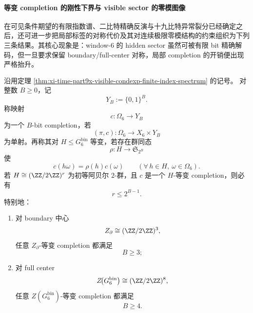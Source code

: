 \paragraph{等变 completion 的刚性下界与 visible sector 的零模图像}
在可见条件期望的有限指数谱、二比特精确反演与十九比特异常裂分已经确定之后，还可进一步把局部标签的对称代价及其对连续极限零模结构的约束组织为下列三条结果。其核心现象是：window-\(6\) 的 hidden sector 虽然可被有限 bit 精确解码，但一旦要求保留 boundary/full-center 对称，局部 completion 的开销便出现严格抬升。

\begin{theorem}\label{thm:xi-time-part9x-equivariant-completion-bit-lower-bound}
沿用定理 \ref{thm:xi-time-part9x-visible-condexp-finite-index-spectrum} 的记号。
对整数 \(B\ge 0\)，记
\[
Y_B:=\{0,1\}^B.
\]
称映射
\[
c:\Omega_6\to Y_B
\]
为一个 \(B\)-bit completion，若
\[
(\pi,c):\Omega_6\longrightarrow X_6\times Y_B
\]
为单射。再称其对 \(H\le G_6^{\mathrm{bin}}\) 等变，若存在群同态
\[
\rho:H\to \mathfrak S_{2^B}
\]
使
\[
c(h\omega)=\rho(h)c(\omega)
\qquad
(\forall\, h\in H,\ \omega\in \Omega_6).
\]
若 \(H\cong (\ZZ/2\ZZ)^r\) 为初等阿贝尔 \(2\)-群，且 \(c\) 是一个 \(H\)-等变 completion，则必有
\[
r\le 2^{B-1}.
\]
特别地：
\begin{enumerate}
  \item 对 boundary 中心
  \[
  Z_{\partial}\cong (\ZZ/2\ZZ)^3,
  \]
  任意 \(Z_{\partial}\)-等变 completion 都满足
  \[
  B\ge 3;
  \]
  \item 对 full center
  \[
  Z\!\bigl(G_6^{\mathrm{bin}}\bigr)\cong (\ZZ/2\ZZ)^8,
  \]
  任意 \(Z(G_6^{\mathrm{bin}})\)-等变 completion 都满足
  \[
  B\ge 4.
  \]
\end{enumerate}
\end{theorem}
